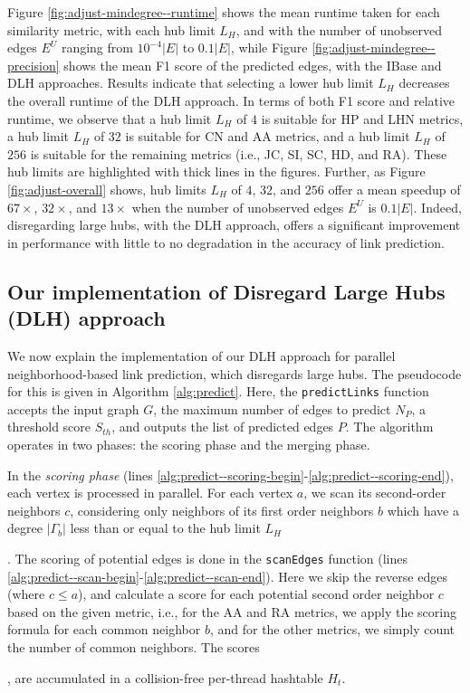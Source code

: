 Figure \ref{fig:adjust-mindegree--runtime} shows the mean runtime taken for each similarity metric, with each hub limit $L_H$, and with the number of unobserved edges $E^U$ ranging from $10^{-4}|E|$ to $0.1|E|$, while Figure \ref{fig:adjust-mindegree--precision} shows the mean F1 score of the predicted edges, with the IBase and DLH approaches. Results indicate that selecting a lower hub limit $L_H$ decreases the overall runtime of the DLH approach. In terms of both F1 score and relative runtime, we observe that a hub limit $L_H$ of $4$ is suitable for HP and LHN metrics, a hub limit $L_H$ of $32$ is suitable for CN and AA metrics, and a hub limit $L_H$ of $256$ is suitable for the remaining metrics (i.e., JC, SI, SC, HD, and RA). These hub limits are highlighted with thick lines in the figures. Further, as Figure \ref{fig:adjust-overall} shows, hub limits $L_H$ of $4$, $32$, and $256$ offer a mean speedup of $67\times$, $32\times$, and $13\times$ when the number of unobserved edges $E^U$ is $0.1|E|$. Indeed, disregarding large hubs, with the DLH approach, offers a significant improvement in performance with little to no degradation in the accuracy of link prediction.




\subsection{Our implementation of Disregard Large Hubs (DLH) approach}

We now explain the implementation of our DLH approach for parallel neighborhood-based link prediction, which disregards large hubs. The pseudocode for this is given in Algorithm \ref{alg:predict}. Here, the \texttt{predictLinks} function accepts the input graph $G$, the maximum number of edges to predict $N_P$, a threshold score $S_{th}$, and outputs the list of predicted edges $P$. The algorithm operates in two phases: the scoring phase and the merging phase.

In the \textit{scoring phase} (lines \ref{alg:predict--scoring-begin}-\ref{alg:predict--scoring-end}), each vertex is processed in parallel. For each vertex $a$, we scan its second-order neighbors $c$, considering only neighbors of its first order neighbors $b$ which have a degree $|\Gamma_b|$ less than or equal to the hub limit $L_H$. The scoring of potential edges is done in the \texttt{scanEdges} function (lines \ref{alg:predict--scan-begin}-\ref{alg:predict--scan-end}). Here we skip the reverse edges (where $c \leq a$), and calculate a score for each potential second order neighbor $c$ based on the given metric, i.e., for the AA and RA metrics, we apply the scoring formula for each common neighbor $b$, and for the other metrics, we simply count the number of common neighbors. The scores, are accumulated in a collision-free per-thread hashtable $H_t$.

